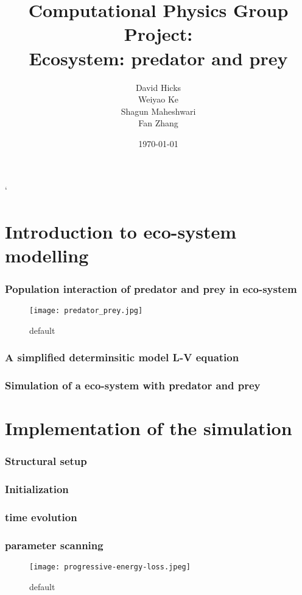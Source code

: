 \documentclass{beamer}
\title{Computational Physics Group Project: \\ Ecosystem: predator and prey}
\author{David Hicks\\ Weiyao Ke \\ Shagun Maheshwari \\ Fan Zhang}
\date{\today}
\begin{document}
`	
\frame{\titlepage}

\section[Outline]{}
\frame{\tableofcontents}

\section{Introduction to eco-system modelling}
\frame
{
  \frametitle{Population interaction of predator and prey in eco-system}
\begin{figure}[htbp]
\begin{center}
\texttt{[image: predator\_prey.jpg]}
\caption{default}
\label{default}
\end{center}
\end{figure}

  
}
\frame
{
  \frametitle{A simplified determinsitic model L-V equation}
  
}
\frame
{
  \frametitle{Simulation of a eco-system with predator and prey}
  
}

\section{Implementation of the simulation}
\frame
{
  \frametitle{Structural setup}
  
}

\frame
{
  \frametitle{Initialization}
  
}

\frame
{
  \frametitle{time evolution}
  
}

\frame
{
  \frametitle{parameter scanning}
\begin{figure}[htbp]
\begin{center}
\texttt{[image: progressive-energy-loss.jpeg]}
\caption{default}
\label{default}
\end{center}
\end{figure}

  
}
\end{document}
